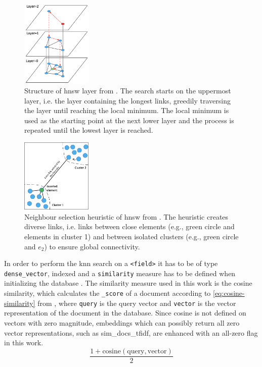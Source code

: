 \begin{figure}[htp] %
    \centering
    \includegraphics[width=0.3\textwidth]{images/HNSW-layer.png}
    \caption{Structure of \ac{hnsw} layer from \cite{Elasticsearch-kNN-HNSW}.
    The search starts on the uppermost layer, i.e. the layer containing the longest links, greedily traversing the layer until reaching the local minimum.
    The local minimum is used as the starting point at the next lower layer and the process is repeated until the lowest layer is reached.
    }
    \label{fig:hnsw-layer}
\end{figure}

\begin{figure}[htp] %
    \centering
    \includegraphics[width=0.3\textwidth]{images/HNSW-neighbour-selection-heuristic.png}
    \caption{Neighbour selection heuristic of \ac{hnsw} from \cite{Elasticsearch-kNN-HNSW}.
    The heuristic creates diverse links, i.e. links between close elements (e.g., green circle and elements in cluster 1) 
    and between isolated clusters (e.g., green circle and $e_2$) to ensure global connectivity.
    }
    \label{fig:hnsw-heuristic}
\end{figure}

In order to perform the \ac{knn} search on a \texttt{<field>} it has to be of type \texttt{dense\_vector}, indexed and a \texttt{similarity} measure has to be defined when initializing the database \cite{Elasticsearch-knn}.
The similarity measure used in this work is the cosine similarity, which calculates the \texttt{\_score} of a document according to \autoref{eq:cosine-similarity} from \cite{Elasticsearch-kNN-similarity}, 
where \texttt{query} is the query vector and \texttt{vector} is the vector representation of the document in the database.
Since cosine is not defined on vectors with zero magnitude, embeddings which can possibly return all zero vector representations, such as sim\_docs\_tfidf, are enhanced with an all-zero flag in this work.
\begin{equation}
    \frac{1 + \text{cosine}(\text{query}, \text{vector})}{2}
    \label{eq:cosine-similarity}
\end{equation}

